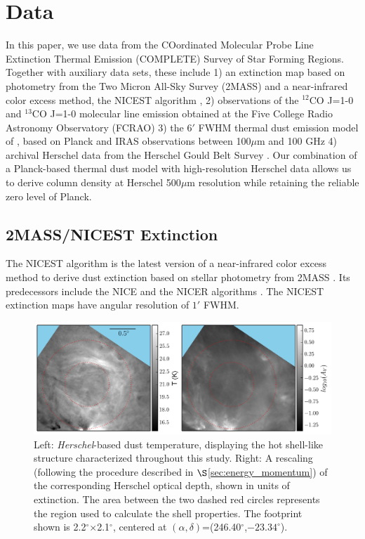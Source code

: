\documentclass[11pt,a4paper]{emulateapj}
\begin{document}
\section{Data}
\label{sec:data}
In this paper, we use data from the COordinated Molecular Probe Line Extinction Thermal Emission (COMPLETE) Survey of Star Forming Regions. Together with auxiliary data sets, these include 1) an extinction map based on photometry from the Two Micron All-Sky Survey (2MASS) and a near-infrared color excess method, the NICEST algorithm \citep[][note that this is an improved version of the NICER algorithm and is developed after the COMPLETE Survey]{Lombardi_2009}, 2) observations of the $^{12}$CO J=1-0 and $^{13}$CO J=1-0 molecular line emission obtained at the Five College Radio Astronomy Observatory (FCRAO) 3) the 6$'$ FWHM thermal dust emission model of \cite{Meisner_2015}, based on Planck and IRAS observations between 100$\mu$m and 100 GHz 4) archival Herschel data from the Herschel Gould Belt Survey \citep{Andre_2010}. Our combination of a Planck-based thermal dust model with high-resolution Herschel data allows us to derive column density at Herschel 500$\mu$m resolution while retaining the reliable zero level of Planck.

\subsection{2MASS/NICEST Extinction}
The NICEST algorithm is the latest version of a near-infrared color excess method to derive dust extinction based on stellar photometry from 2MASS \citep{Lombardi_2009}. Its predecessors include the NICE and the NICER algorithms \citep{Lombardi_2001,Lombardi_2005}. The NICEST extinction maps have angular resolution of $1'$ FWHM.

\begin{figure}[ht]
\centering
\includegraphics[scale=0.8]{fig/shell_herschel.png}
\caption{\label{fig:herschel_shell}Left: \textit{Herschel}-based dust temperature, displaying the hot shell-like structure characterized throughout this study. Right: A rescaling (following the procedure described in $\S$\ref{sec:energy_momentum}) of the corresponding Herschel optical depth, shown in units of extinction. The area between the two dashed red circles represents the region used to calculate the shell properties. The footprint shown is 2.2$^{\circ}$$\times$2.1$^{\circ}$, centered at $(\alpha, \delta)$=(246.40$^{\circ}$,$-23.34^{\circ}$).}
\end{figure}
\end{document}
